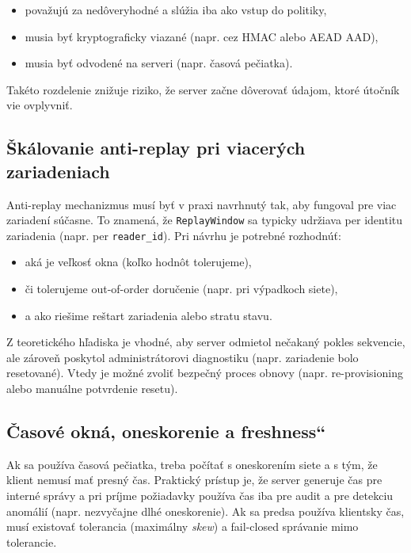 \documentclass[journal,a4paper,onecolumn]{IEEEtran}
\newcommand{\uv}[1]{\quotedblbase#1\textquotedblleft}
\begin{document}
\begin{itemize}[leftmargin=*,itemsep=2pt]
  \item považujú za nedôveryhodné a slúžia iba ako vstup do politiky,
  \item musia byť kryptograficky viazané (napr. cez HMAC alebo AEAD AAD),
  \item musia byť odvodené na serveri (napr. časová pečiatka).
\end{itemize}

Takéto rozdelenie znižuje riziko, že server začne dôverovať údajom, ktoré útočník vie ovplyvniť.

\subsection{Škálovanie anti-replay pri viacerých zariadeniach}

Anti-replay mechanizmus musí byť v praxi navrhnutý tak, aby fungoval pre viac zariadení súčasne. To znamená, že \texttt{ReplayWindow} sa typicky udržiava per identitu zariadenia (napr. per \texttt{reader\_id}). Pri návrhu je potrebné rozhodnúť:

\begin{itemize}[leftmargin=*,itemsep=2pt]
  \item aká je veľkosť okna (koľko hodnôt tolerujeme),
  \item či tolerujeme out-of-order doručenie (napr. pri výpadkoch siete),
  \item a ako riešime reštart zariadenia alebo stratu stavu.
\end{itemize}

Z teoretického hľadiska je vhodné, aby server odmietol nečakaný pokles sekvencie, ale zároveň poskytol administrátorovi diagnostiku (napr. zariadenie bolo resetované). Vtedy je možné zvoliť bezpečný proces obnovy (napr. re-provisioning alebo manuálne potvrdenie resetu).

\subsection{Časové okná, oneskorenie a \uv{freshness}}

Ak sa používa časová pečiatka, treba počítať s oneskorením siete a s tým, že klient nemusí mať presný čas. Praktický prístup je, že server generuje čas pre interné správy a pri príjme požiadavky používa čas iba pre audit a pre detekciu anomálií (napr. nezvyčajne dlhé oneskorenie). Ak sa predsa používa klientsky čas, musí existovať tolerancia (maximálny \emph{skew}) a fail-closed správanie mimo tolerancie.
\end{document}
